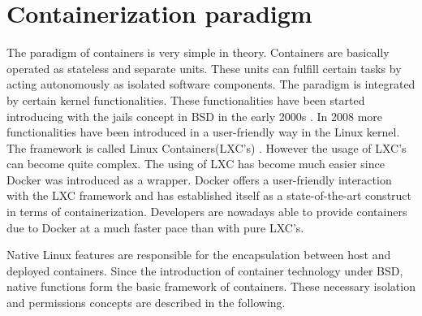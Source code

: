 \section{Containerization paradigm}
\label{sec:intro:containerization}
%
% 
The paradigm of containers is very simple in theory. Containers are basically operated as stateless and separate units. These units can fulfill certain tasks by acting autonomously as isolated software components.
The paradigm is integrated by certain kernel functionalities. These functionalities have been started introducing with the jails concept in BSD in the early 2000s \cite{Souppaya:2017aa}. In 2008 more functionalities have been introduced in a user-friendly way in the Linux kernel. The framework is called Linux Containers(LXC's) \cite{Souppaya:2017aa}.
However the usage of LXC's can become quite complex. The using of LXC has become much easier since Docker was introduced as a wrapper. Docker offers a user-friendly interaction with the LXC framework and has established itself as a state-of-the-art construct in terms of containerization.
Developers are nowadays able to provide containers due to Docker at a much faster pace than with pure LXC's. 
	
Native Linux features are responsible for the encapsulation between host and deployed containers.
Since the introduction of container technology under BSD, native functions form the basic framework of containers.
These necessary isolation and permissions concepts are described in the following.